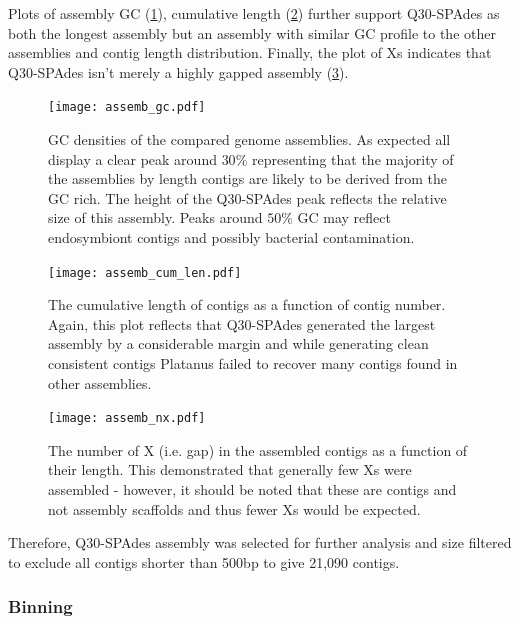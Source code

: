 Plots of assembly GC (\cref{fig:assemb_gc}), cumulative length (\cref{fig:assemb_len})
further support Q30-SPAdes as both the longest assembly
but an assembly with similar GC profile to the other assemblies and contig length distribution.
Finally, the plot of Xs indicates that Q30-SPAdes isn't merely a highly gapped
assembly (\cref{fig:assemb_nx}).

\begin{figure}
    \centering
    \texttt{[image: assemb\_gc.pdf]}
    \caption[Genome Assembly GC Densities]{GC densities of the compared genome assemblies.  As expected
        all display a clear peak around \(30\%\) representing that the majority
    of the assemblies by length contigs are likely to be derived from the GC rich.
The height of the Q30-SPAdes peak reflects the relative size of this assembly.
Peaks around \(50\%\) GC may reflect endosymbiont contigs and possibly
bacterial contamination.}
    \label{fig:assemb_gc}
\end{figure}

\begin{figure}
    \centering
    \texttt{[image: assemb\_cum\_len.pdf]}
    \caption[Genome Assembly Cumulative Contig Lengths]{The cumulative length of contigs as a function of
        contig number.  Again, this plot reflects
        that Q30-SPAdes generated the largest assembly
        by a considerable margin and while generating
        clean consistent contigs Platanus failed to recover
    many contigs found in other assemblies.}
    \label{fig:assemb_len}
\end{figure}

\begin{figure}
    \centering
    \texttt{[image: assemb\_nx.pdf]}
    \caption[Genome Assembly Assembly Gaps]{The number of X (i.e. gap) in the assembled contigs as a function of their
        length.  This demonstrated that generally few Xs were assembled - however, it should 
        be noted that these are contigs and not assembly scaffolds and thus fewer Xs
    would be expected.}
    \label{fig:assemb_nx}
\end{figure}

Therefore, Q30-SPAdes assembly was selected for further analysis
and size filtered to exclude all contigs shorter than 500bp 
to give 21,090 contigs. 

\subsubsection{Binning}

